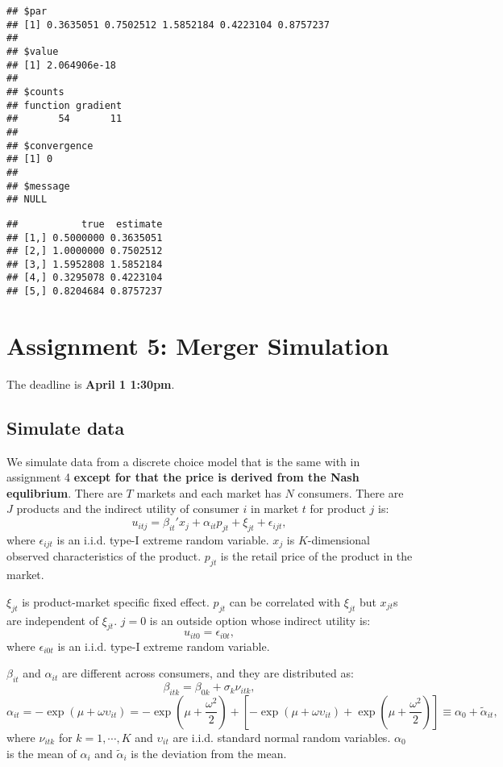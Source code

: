 \documentclass[
]{book}
\begin{document}
\begin{verbatim}
## $par
## [1] 0.3635051 0.7502512 1.5852184 0.4223104 0.8757237
## 
## $value
## [1] 2.064906e-18
## 
## $counts
## function gradient 
##       54       11 
## 
## $convergence
## [1] 0
## 
## $message
## NULL
\end{verbatim}

\begin{verbatim}
##           true  estimate
## [1,] 0.5000000 0.3635051
## [2,] 1.0000000 0.7502512
## [3,] 1.5952808 1.5852184
## [4,] 0.3295078 0.4223104
## [5,] 0.8204684 0.8757237
\end{verbatim}

\hypertarget{assignment5}{%
\chapter{Assignment 5: Merger Simulation}\label{assignment5}}

The deadline is \textbf{April 1 1:30pm}.

\hypertarget{simulate-data}{%
\section{Simulate data}\label{simulate-data}}

We simulate data from a discrete choice model that is the same with in assignment 4 \textbf{except for that the price is derived from the Nash equlibrium}. There are \(T\) markets and each market has \(N\) consumers. There are \(J\) products and the indirect utility of consumer \(i\) in market \(t\) for product \(j\) is:
\[
u_{itj} = \beta_{it}' x_j + \alpha_{it} p_{jt} + \xi_{jt} + \epsilon_{ijt},
\]
where \(\epsilon_{ijt}\) is an i.i.d. type-I extreme random variable. \(x_j\) is \(K\)-dimensional observed characteristics of the product. \(p_{jt}\) is the retail price of the product in the market.

\(\xi_{jt}\) is product-market specific fixed effect. \(p_{jt}\) can be correlated with \(\xi_{jt}\) but \(x_{jt}\)s are independent of \(\xi_{jt}\). \(j = 0\) is an outside option whose indirect utility is:
\[
u_{it0} = \epsilon_{i0t},
\]
where \(\epsilon_{i0t}\) is an i.i.d. type-I extreme random variable.

\(\beta_{it}\) and \(\alpha_{it}\) are different across consumers, and they are distributed as:
\[
\beta_{itk} = \beta_{0k} + \sigma_k \nu_{itk},
\]
\[
\alpha_{it} = - \exp(\mu + \omega \upsilon_{it}) = - \exp(\mu + \frac{\omega^2}{2}) + [- \exp(\mu + \omega \upsilon_{it}) + \exp(\mu + \frac{\omega^2}{2})] \equiv \alpha_0 + \tilde{\alpha}_{it},
\]
where \(\nu_{itk}\) for \(k = 1, \cdots, K\) and \(\upsilon_{it}\) are i.i.d. standard normal random variables. \(\alpha_0\) is the mean of \(\alpha_i\) and \(\tilde{\alpha}_i\) is the deviation from the mean.
\end{document}
